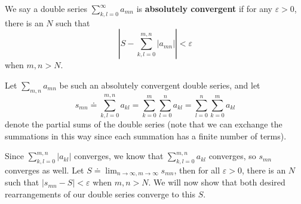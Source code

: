 \documentclass[10pt]{amsart}
\begin{document}
We say a double series $\sum_{k,l=0}^{\infty} a_{mn}$ is \textbf{absolutely convergent} if for any $\varepsilon>0$, there is an $N$ such that
\[
\left| S - \sum_{k,l=0}^{m,n} |a_{mn}| \right| < \varepsilon
\] when $m,n > N$.

Let $\sum_{m,n}a_{mn}$ be such an absolutely convergent double series, and let
\[
s_{mn} \doteq \sum_{k,l=0}^{m,n} a_{kl} = \sum_{k=0}^{m} \sum_{l=0}^{n} a_{kl} = \sum_{l=0}^{n} \sum_{k=0}^{m} a_{kl}
\] denote the partial sums of the double series (note that we can exchange the summations in this way since each summation has a finite number of terms).

Since $\sum_{k,l=0}^{m,n} |a_{kl}|$ converges, we know that $\sum_{k,l=0}^{m,n} a_{kl}$ converges, so $s_{mn}$ converges as well. Let $S \doteq \lim_{n \to \infty, m \to \infty} s_{mn}$, then for all $\varepsilon>0$, there is an $N$ such that $|s_{mn}-S|<\varepsilon$ when $m,n > N$. We will now show that both desired rearrangements of our double series converge to this $S$.
\end{document}
